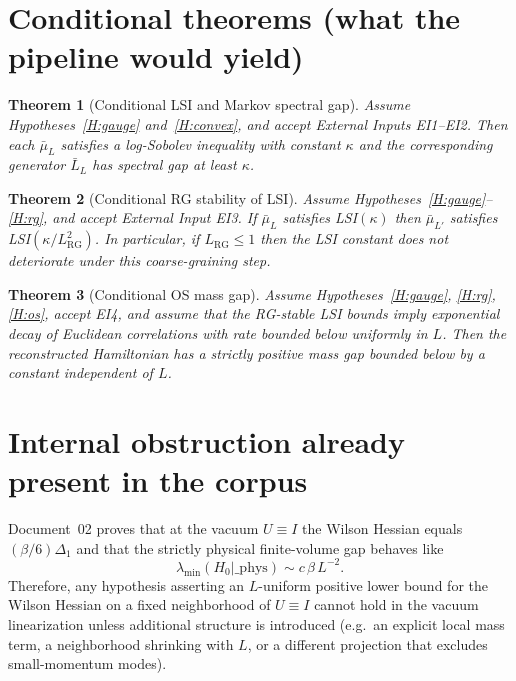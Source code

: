 \documentclass[11pt]{article}
\newtheorem{theorem}{Theorem}
\begin{document}
\section{Conditional theorems (what the pipeline would yield)}

\begin{theorem}[Conditional LSI and Markov spectral gap]\label{thm:lsi}
Assume Hypotheses~\ref{H:gauge} and~\ref{H:convex}, and accept External Inputs EI1--EI2.
Then each $\bar\mu_L$ satisfies a log-Sobolev inequality with constant $\kappa$ and the corresponding generator $\bar L_L$ has spectral gap at least $\kappa$.
\end{theorem}

\begin{theorem}[Conditional RG stability of LSI]\label{thm:rg}
Assume Hypotheses~\ref{H:gauge}--\ref{H:rg}, and accept External Input EI3.
If $\bar\mu_L$ satisfies LSI$(\kappa)$ then $\bar\mu_{L'}$ satisfies LSI$(\kappa/L_{\mathrm{RG}}^2)$.
In particular, if $L_{\mathrm{RG}}\le 1$ then the LSI constant does not deteriorate under this coarse-graining step.
\end{theorem}

\begin{theorem}[Conditional OS mass gap]\label{thm:osgap}
Assume Hypotheses~\ref{H:gauge}, \ref{H:rg}, \ref{H:os}, accept EI4, and assume that the RG-stable LSI bounds imply exponential decay of Euclidean correlations with rate bounded below uniformly in $L$.
Then the reconstructed Hamiltonian has a strictly positive mass gap bounded below by a constant independent of $L$.
\end{theorem}

\section{Internal obstruction already present in the corpus}

Document~02 proves that at the vacuum $U\equiv I$ the Wilson Hessian equals $(\beta/6)\Delta_1$ and that the strictly physical finite-volume gap behaves like
\[
\lambda_{\min}(H_0|\_{\mathrm{phys}})\sim c\,\beta\,L^{-2}.
\]
Therefore, any hypothesis asserting an $L$-uniform positive lower bound for the Wilson Hessian on a fixed neighborhood of $U\equiv I$ cannot hold in the vacuum linearization unless additional structure is introduced (e.g.\ an explicit local mass term, a neighborhood shrinking with $L$, or a different projection that excludes small-momentum modes).
\end{document}
